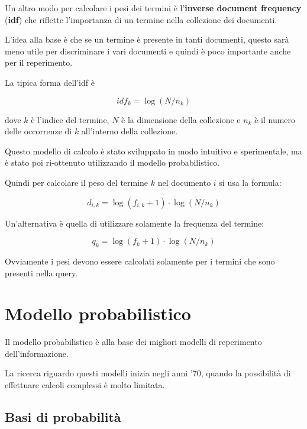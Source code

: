 


Un altro modo per calcolare i pesi dei termini è l'\textbf{inverse document frequency} (\textbf{idf}) che riflette l'importanza di un termine nella collezione dei documenti.

L'idea alla base è che se un termine è presente in tanti documenti, questo sarà meno utile per discriminare i vari documenti e quindi è poco importante anche per il reperimento.

La tipica forma dell'idf è

$$
idf_k = \log(N / n_k)
$$

\noindent dove $k$ è l'indice del termine, $N$ è la dimensione della collezione e $n_k$ è il numero delle occorrenze di $k$ all'interno della collezione.

Questo modello di calcolo è stato sviluppato in modo intuitivo e sperimentale, ma è stato poi ri-ottenuto utilizzando il modello probabilistico.

Quindi per calcolare il peso del termine $k$ nel documento $i$ si usa la formula:

$$
d_{i,k} = \log (f_{i,k} +1 ) \cdot \log(N/n_k)
$$

\noindent Un'alternativa è quella di utilizzare solamente la frequenza del termine:

$$
q_k = \log(f_k +1 )\cdot \log (N/n_k)
$$

\noindent Ovviamente i pesi devono essere calcolati solamente per i termini che sono presenti nella query.

\section{Modello probabilistico}

Il modello probabilistico è alla base dei migliori modelli di reperimento dell'informazione.

La ricerca riguardo questi modelli inizia negli anni '70, quando la possibilità di effettuare calcoli complessi è molto limitata.

\subsection{Basi di probabilità}

